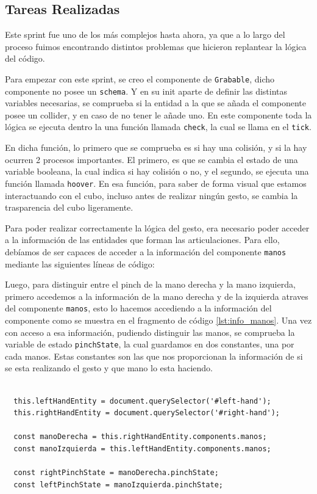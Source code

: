 \documentclass[a4paper, 12pt]{book}
\begin{document}
\subsection{Tareas Realizadas}
\label{subsec:implementacion5}
Este sprint fue uno de los más complejos hasta ahora, ya que a lo largo del proceso fuimos encontrando distintos problemas que hicieron replantear la lógica del código. 

Para empezar con este sprint, se creo el componente de \texttt{Grabable}, dicho componente no posee un \texttt{schema}. Y en su init aparte de definir las distintas variables necesarias, se comprueba si la entidad a la que se añada el componente posee un collider, y en caso de no tener le añade uno.
En este componente toda la lógica se ejecuta dentro la una función llamada \texttt{check}, la cual se llama en el \texttt{tick}. 

En dicha función, lo primero que se comprueba es si hay una colisión, y si la hay ocurren 2 procesos importantes. El primero, es que se cambia el estado de una variable booleana, la cual indica si hay colisión o no, y el segundo, se ejecuta una función llamada \texttt{hoover}. En esa función, para saber de forma visual que estamos interactuando con el cubo, incluso antes de realizar ningún gesto, se cambia la trasparencia del cubo ligeramente.

Para poder realizar correctamente la lógica del gesto, era necesario poder acceder a la información de las entidades que forman las articulaciones. Para ello, debíamos de ser capaces de acceder a la información del componente \texttt{manos} mediante las siguientes líneas de código:

Luego, para distinguir entre el pinch de la mano derecha y la mano izquierda, primero accedemos a la información de la mano derecha y de la izquierda atraves del componente \texttt{manos}, esto lo hacemos accediendo a la información del componente como se muestra en el fragmento de código \ref{lst:info_manos}. Una vez con acceso a esa información, pudiendo distinguir las manos, se comprueba la variable de estado \texttt{pinchState}, la cual guardamos en dos constantes, una por cada manos. Estas constantes son las que nos proporcionan la información de si se esta realizando el gesto y que mano lo esta haciendo.

\begin{lstlisting}[caption=Acceso información componente manos, captionpos=b, label=lst:info_manos]
  
  this.leftHandEntity = document.querySelector('#left-hand');
  this.rightHandEntity = document.querySelector('#right-hand');

  const manoDerecha = this.rightHandEntity.components.manos;
  const manoIzquierda = this.leftHandEntity.components.manos;

  const rightPinchState = manoDerecha.pinchState;
  const leftPinchState = manoIzquierda.pinchState;
\end{lstlisting}
\end{document}
